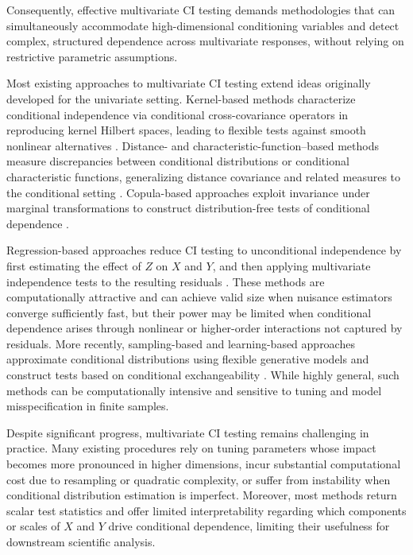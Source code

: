 \documentclass[12pt,reqno,oneside]{amsbook}
\theoremstyle{definition}
\theoremstyle{remark}
\begin{document}
Consequently, effective multivariate CI testing demands methodologies that can
simultaneously accommodate high-dimensional conditioning variables and detect
complex, structured dependence across multivariate responses, without relying
on restrictive parametric assumptions.


Most existing approaches to multivariate CI testing extend ideas originally
developed for the univariate setting. Kernel-based methods characterize
conditional independence via conditional cross-covariance operators in
reproducing kernel Hilbert spaces, leading to flexible tests against smooth
nonlinear alternatives \citep{Fukumizu2007KernelMO,zhang2012kernelbased,strobl2017approximate}.
Distance- and characteristic-function–based methods measure discrepancies
between conditional distributions or conditional characteristic functions,
generalizing distance covariance and related measures to the conditional setting
\citep{wang2015conditional,Su2014TestingCI}.
Copula-based approaches exploit invariance under marginal transformations to
construct distribution-free tests of conditional dependence
\citep{GenestRemillard2004,BergsmaDassios2014}.

Regression-based approaches reduce CI testing to unconditional independence by
first estimating the effect of $Z$ on $X$ and $Y$, and then applying multivariate
independence tests to the resulting residuals
\citep{Hoyer2008ANM,Shah_2020,Zhang2023SCIT}. These methods are computationally
attractive and can achieve valid size when nuisance estimators converge
sufficiently fast, but their power may be limited when conditional dependence
arises through nonlinear or higher-order interactions not captured by residuals.
More recently, sampling-based and learning-based approaches approximate
conditional distributions using flexible generative models and construct tests
based on conditional exchangeability
\citep{bellot2019conditional,shi2021double,duong2022conditional}.
While highly general, such methods can be computationally intensive and sensitive
to tuning and model misspecification in finite samples.

Despite significant progress, multivariate CI testing remains challenging in
practice. Many existing procedures rely on tuning parameters whose impact
becomes more pronounced in higher dimensions, incur substantial computational
cost due to resampling or quadratic complexity, or suffer from instability when
conditional distribution estimation is imperfect. Moreover, most methods return
scalar test statistics and offer limited interpretability regarding which
components or scales of $X$ and $Y$ drive conditional dependence, limiting their
usefulness for downstream scientific analysis.
\end{document}
